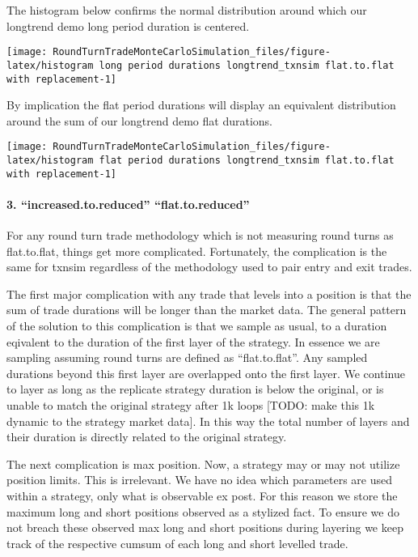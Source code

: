 The histogram below confirms the normal distribution around which our
longtrend demo long period duration is centered.

\begin{Schunk}

\texttt{[image: RoundTurnTradeMonteCarloSimulation\_files/figure-latex/histogram long period durations longtrend\_txnsim flat.to.flat with replacement-1]} \end{Schunk}

By implication the flat period durations will display an equivalent
distribution around the sum of our longtrend demo flat durations.

\begin{Schunk}

\texttt{[image: RoundTurnTradeMonteCarloSimulation\_files/figure-latex/histogram flat period durations longtrend\_txnsim flat.to.flat with replacement-1]} \end{Schunk}

\hypertarget{increased.to.reduced-flat.to.reduced}{%
\paragraph{3. ``increased.to.reduced'' \textbar{}\textbar{}
``flat.to.reduced''}\label{increased.to.reduced-flat.to.reduced}}

For any round turn trade methodology which is not measuring round turns
as flat.to.flat, things get more complicated. Fortunately, the
complication is the same for txnsim regardless of the methodology used
to pair entry and exit trades.

The first major complication with any trade that levels into a position
is that the sum of trade durations will be longer than the market data.
The general pattern of the solution to this complication is that we
sample as usual, to a duration eqivalent to the duration of the first
layer of the strategy. In essence we are sampling assuming round turns
are defined as ``flat.to.flat''. Any sampled durations beyond this first
layer are overlapped onto the first layer. We continue to layer as long
as the replicate strategy duration is below the original, or is unable
to match the original strategy after 1k loops {[}TODO: make this 1k
dynamic to the strategy market data{]}. In this way the total number of
layers and their duration is directly related to the original strategy.

The next complication is max position. Now, a strategy may or may not
utilize position limits. This is irrelevant. We have no idea which
parameters are used within a strategy, only what is observable ex post.
For this reason we store the maximum long and short positions observed
as a stylized fact. To ensure we do not breach these observed max long
and short positions during layering we keep track of the respective
cumsum of each long and short levelled trade.

